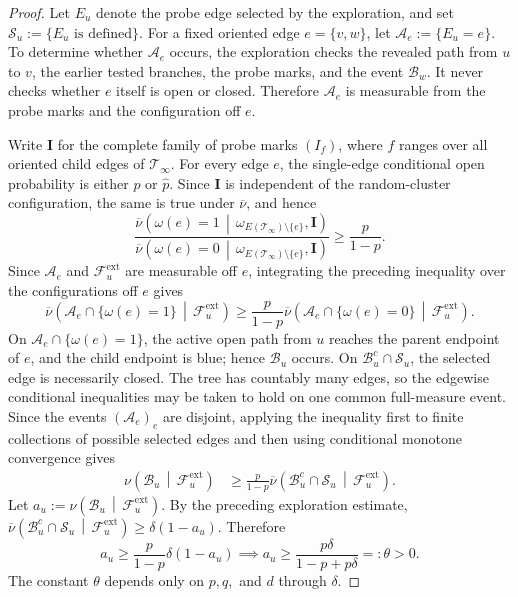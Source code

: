 \documentclass[11pt]{amsart}
\theoremstyle{plain}
\theoremstyle{definition}
\theoremstyle{remark}
\begin{document}
\begin{proof}
Let $E_u$ denote the probe edge selected by the exploration, and set $\mathcal S_u:=\{E_u\text{ is defined}\}$. For a fixed oriented edge $e=\{v,w\}$, let $\mathcal A_e:=\{E_u=e\}$. To determine whether $\mathcal A_e$ occurs, the exploration checks the revealed path from $u$ to $v$, the earlier tested branches, the probe marks, and the event $\mathcal B_w$. It never checks whether $e$ itself is open or closed. Therefore $\mathcal A_e$ is measurable from the probe marks and the configuration off $e$.

Write $\mathbf I$ for the complete family of probe marks $(I_f)$, where $f$ ranges over all oriented child edges of $\mathcal T_\infty$. For every edge $e$, the single-edge conditional open probability is either $p$ or $\widehat p$. Since $\mathbf I$ is independent of the random-cluster configuration, the same is true under $\overline\nu$, and hence
\[
    \frac{
        \overline\nu\left(
            \omega(e)=1
            \,\middle|\,
            \omega_{E(\mathcal T_\infty)\setminus\{e\}},
            \mathbf I
        \right)
    }{
        \overline\nu\left(
            \omega(e)=0
            \,\middle|\,
            \omega_{E(\mathcal T_\infty)\setminus\{e\}},
            \mathbf I
        \right)
    }
    \ge
    \frac{p}{1-p}.
\]
Since $\mathcal A_e$ and $\mathcal F_u^{\mathrm{ext}}$ are measurable off $e$, integrating the preceding inequality over the configurations off $e$ gives
\[
    \overline\nu\left(
        \mathcal A_e\cap\{\omega(e)=1\}
        \,\middle|\,
        \mathcal F_u^{\mathrm{ext}}
    \right)
    \ge
    \frac{p}{1-p}
    \overline\nu\left(
        \mathcal A_e\cap\{\omega(e)=0\}
        \,\middle|\,
        \mathcal F_u^{\mathrm{ext}}
    \right).
\]
On $\mathcal A_e\cap\{\omega(e)=1\}$, the active open path from $u$ reaches the parent endpoint of $e$, and the child endpoint is blue; hence $\mathcal B_u$ occurs. On $\mathcal B_u^c\cap\mathcal S_u$, the selected edge is necessarily closed. The tree has countably many edges, so the edgewise conditional inequalities may be taken to hold on one common full-measure event. Since the events $(\mathcal A_e)_e$ are disjoint, applying the inequality first to finite collections of possible selected edges and then using conditional monotone convergence gives
\[
\begin{aligned}
    \nu\left(
        \mathcal B_u
        \,\middle|\,
        \mathcal F_u^{\mathrm{ext}}
    \right)
    &\ge
    \frac{p}{1-p}
    \overline\nu\left(
        \mathcal B_u^c\cap\mathcal S_u
        \,\middle|\,
        \mathcal F_u^{\mathrm{ext}}
    \right).
\end{aligned}
\]
Let $a_u:=\nu\left(\mathcal B_u\,\middle|\,\mathcal F_u^{\mathrm{ext}}\right)$. By the preceding exploration estimate, $\overline\nu\left(\mathcal B_u^c\cap\mathcal S_u\,\middle|\,\mathcal F_u^{\mathrm{ext}}\right)\ge\delta(1-a_u)$. Therefore
\[
    a_u
    \ge
    \frac{p}{1-p}\delta(1-a_u)
    \implies
    a_u
    \ge
    \frac{p\delta}{1-p+p\delta}
    =:
    \theta
    >0.
\]
The constant $\theta$ depends only on $p,q,$ and $d$ through $\delta$.
\end{proof}
\end{document}
